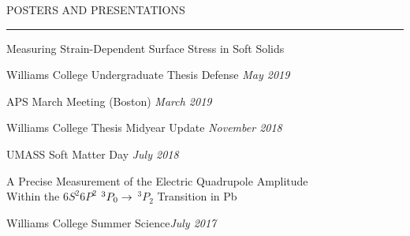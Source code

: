 \documentclass{resume} %
\renewenvironment{rSection}[1]{
	\sectionskip
	\textcolor{RoyalPurple}{\MakeUppercase{#1}}
	\sectionlineskip
	\hrule
	\begin{list}{}{
			\setlength{\leftmargin}{1.5em}
		}
		\item[]
	}{
	\end{list}
}
\begin{document}
\pagebreak
\begin{rSection}{Posters and Presentations} \itemsep -2pt
%
%
%
%


		\begin{rSubsection}{Measuring Strain-Dependent Surface Stress in Soft Solids}{}{}{}
			\item {Williams College Undergraduate Thesis Defense} \hfill {\em May 2019}
			\item {APS March Meeting (Boston)} \hfill {\em March 2019}
			\item {Williams College Thesis Midyear Update} \hfill {\em November 2018}
			\item {UMASS Soft Matter Day} \hfill {\em July 2018}
		\end{rSubsection}

			\begin{rSubsection}{ A Precise Measurement of the Electric Quadrupole Amplitude \\ Within the \textbf{${6S^2 6P^2}$ \space ${^3 P_0 \space \rightarrow} \space$ ${^3P_2}$} Transition in Pb}{}{}{}

			\item {Williams College Summer Science\hfill}{\em July 2017}

			\end{rSubsection}



\end{rSection}
\end{document}
